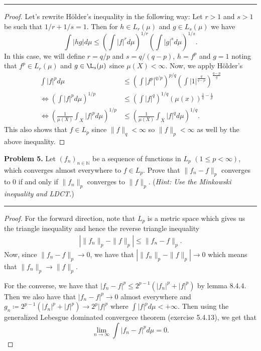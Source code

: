 \documentclass[leqno]{article}
\theoremstyle{nonumberplain}
\newtheorem{proof}{Proof}
\newcommand{\N}{\mathbb{N}}
\begin{document}
\noindent\rule[0.5ex]{\linewidth}{1pt}


\begin{proof}
Let's rewrite H\"{o}lder's inequality in the following way: Let $r>1$ and $s>1$ be such that $1/r+1/s=1$.  Then for $h\in L_r(\mu)$ and $g\in L_s(\mu)$ we have
\[
\int |hg|d\mu \leq \left( \int |f|^r d\mu\right)^{1/r}\left( \int |g|^s d\mu \right)^{1/s}.
\]
In this case, we will define $r=q/p$ and $s=q/(q-p)$, $h=f^p$ and $g=1$ noting that $f^p\in L_r(\mu)$ and $g\in \L_s (\mu)$ since $\mu(X)<\infty$.  Now, we apply H\"{o}lder's
\begin{align*}
\int |f|^p d\mu &\leq \left( \int |f^p|^{q/p}\right)^{p/q} \left( \int |1|^{\frac{q}{q-p}} \right)^{\frac{q-p}{q}}\\
\iff \left( \int |f|^p d\mu \right)^{1/p} & \leq \left( \int |f|^q\right)^{1/q}(\mu(x))^{\frac{1}{q}-\frac{1}{p}}\\
\iff \left( \frac{1}{\mu(X)}\int_X |f|^p d\mu\right)^{1/p} &\leq \left(\frac{1}{\mu(X)}\int_X |f|^q d\mu\right)^{1/q}.
\end{align*}
This also shows that $f\in L_p$ since $\|f\|_q<\infty$ so $\|f\|_p<\infty$ as well by the above inequality.
\end{proof}

\pagebreak




\noindent\textbf{Problem 5.} \quad
Let $(f_n)_{n\in \N}$ be a sequence of functions in $L_p$ $(1\leq p < \infty)$, which converges almost everywhere to $f\in L_p$. Prove that $\|f_n-f\|_p$ converges to $0$ if and only if $\|f_n\|_p$ converges to $\|f\|_p$. (\emph{Hint: Use the Minkowski inequality and LDCT.})


\noindent\rule[0.5ex]{\linewidth}{1pt}

\begin{proof}
For the forward direction, note that $L_p$ is a metric space which gives us the triangle inequality and hence the reverse triangle inequality
\begin{align*}
\left| \|f_n\|_p - \|f\|_p\right| \leq \|f_n-f\|_p.
\end{align*}
Now, since $\|f_n-f\|_p \to 0$, we have that $ \left| \|f_n\|_p - \|f\|_p \right| \to 0$ which means that $\|f_n\|_p \to \|f\|_p$.

For the converse, we have that $|f_n-f|^p\leq 2^{p-1}(|f_n|^p+|f|^p)$ by lemma 8.4.4.  Then we also have that $|f_n-f|^p \to 0$ almost everywhere and $g_n\coloneqq 2^{p-1}(|f_n|^p+|f|^p)\to 2^p|f|^p$ where $\int |f|^p d\mu<+\infty$.  Then using the generalized Lebesgue dominated convergece theorem (exercise 5.4.13), we get that
\[
\lim_{n\to \infty} \int |f_n-f|^p d\mu = 0.
\]
\end{proof}

\pagebreak
\end{document}
